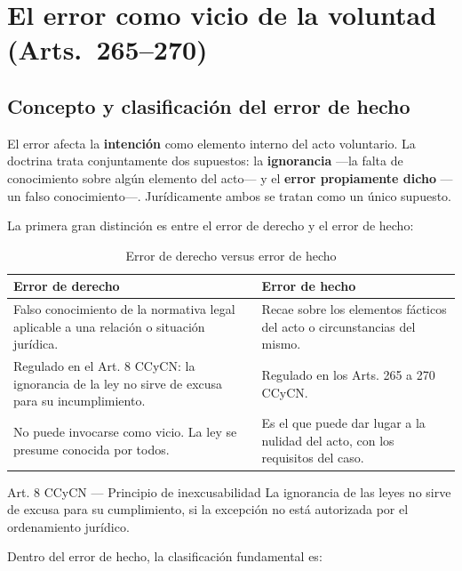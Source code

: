 \documentclass[12pt,oneside]{book}
\begin{document}
\chapter{El error como vicio de la voluntad (Arts.~265--270)}
\label{ch:error}

\section{Concepto y clasificación del error de hecho}

El error afecta la \textbf{intención} como elemento interno del acto voluntario. La doctrina trata conjuntamente dos supuestos: la \textbf{ignorancia} ---la falta de conocimiento sobre algún elemento del acto--- y el \textbf{error propiamente dicho} ---un falso conocimiento---. Jurídicamente ambos se tratan como un único supuesto.

La primera gran distinción es entre el error de derecho y el error de hecho:

\begin{table}[H]
\centering
\begin{tabularx}{\textwidth}{>{\raggedright\arraybackslash}X >{\raggedright\arraybackslash}X}
\toprule
\textbf{Error de derecho} & \textbf{Error de hecho} \\
\midrule
Falso conocimiento de la normativa legal aplicable a una relación o situación jurídica. & Recae sobre los elementos fácticos del acto o circunstancias del mismo. \\[6pt]
Regulado en el Art. 8 CCyCN: la ignorancia de la ley no sirve de excusa para su incumplimiento. & Regulado en los Arts. 265 a 270 CCyCN. \\[6pt]
No puede invocarse como vicio. La ley se presume conocida por todos. & Es el que puede dar lugar a la nulidad del acto, con los requisitos del caso. \\
\bottomrule
\end{tabularx}
\caption{Error de derecho versus error de hecho}
\end{table}

\begin{articulo}{Art. 8 CCyCN --- Principio de inexcusabilidad}
La ignorancia de las leyes no sirve de excusa para su cumplimiento, si la excepción no está autorizada por el ordenamiento jurídico.
\end{articulo}

Dentro del error de hecho, la clasificación fundamental es:
\end{document}
